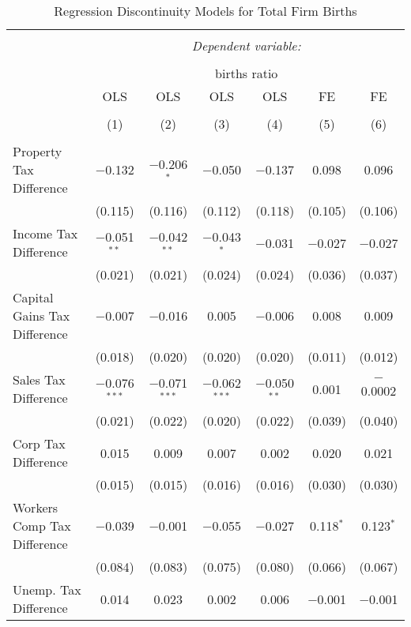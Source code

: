 \documentclass{article}
\begin{document}
\begin{table}[!htbp] \centering 
  \caption{Regression Discontinuity Models for  Total Firm Births} 
  \label{--rd} 
\footnotesize 
\begin{tabular}{@{\extracolsep{5pt}}lcccccc} 
\\[-1.8ex]\hline 
\hline \\[-1.8ex] 
 & \multicolumn{6}{c}{\textit{Dependent variable:}} \\ 
\cline{2-7} 
\\[-1.8ex] & \multicolumn{6}{c}{births ratio} \\ 
 & OLS & OLS & OLS & OLS & FE & FE \\ 
\\[-1.8ex] & (1) & (2) & (3) & (4) & (5) & (6)\\ 
\hline \\[-1.8ex] 
 Property Tax Difference & $-$0.132 & $-$0.206$^{*}$ & $-$0.050 & $-$0.137 & 0.098 & 0.096 \\ 
  & (0.115) & (0.116) & (0.112) & (0.118) & (0.105) & (0.106) \\ 
  Income Tax Difference & $-$0.051$^{**}$ & $-$0.042$^{**}$ & $-$0.043$^{*}$ & $-$0.031 & $-$0.027 & $-$0.027 \\ 
  & (0.021) & (0.021) & (0.024) & (0.024) & (0.036) & (0.037) \\ 
  Capital Gains Tax Difference & $-$0.007 & $-$0.016 & 0.005 & $-$0.006 & 0.008 & 0.009 \\ 
  & (0.018) & (0.020) & (0.020) & (0.020) & (0.011) & (0.012) \\ 
  Sales Tax Difference & $-$0.076$^{***}$ & $-$0.071$^{***}$ & $-$0.062$^{***}$ & $-$0.050$^{**}$ & 0.001 & $-$0.0002 \\ 
  & (0.021) & (0.022) & (0.020) & (0.022) & (0.039) & (0.040) \\ 
  Corp Tax Difference & 0.015 & 0.009 & 0.007 & 0.002 & 0.020 & 0.021 \\ 
  & (0.015) & (0.015) & (0.016) & (0.016) & (0.030) & (0.030) \\ 
  Workers Comp Tax Difference & $-$0.039 & $-$0.001 & $-$0.055 & $-$0.027 & 0.118$^{*}$ & 0.123$^{*}$ \\ 
  & (0.084) & (0.083) & (0.075) & (0.080) & (0.066) & (0.067) \\ 
  Unemp. Tax Difference & 0.014 & 0.023 & 0.002 & 0.006 & $-$0.001 & $-$0.001 \\ 

\end{tabular}
\end{table}
\end{document}

